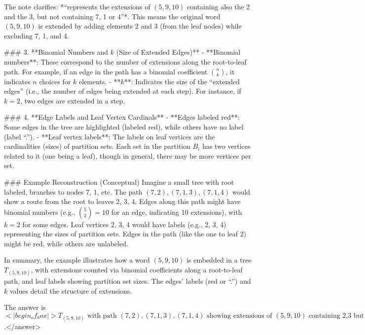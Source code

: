 The note clarifies: *“represents the extensions of \( (5,9,10) \) containing also the 2 and the 3, but not containing 7, 1 or 4”*. This means the original word \( (5,9,10) \) is extended by adding elements 2 and 3 (from the leaf nodes) while excluding 7, 1, and 4.  


### 3. **Binomial Numbers and \( k \) (Size of Extended Edges)**  
- **Binomial numbers**: These correspond to the number of extensions along the root-to-leaf path. For example, if an edge in the path has a binomial coefficient \( \binom{n}{k} \), it indicates \( n \) choices for \( k \) elements.  
- **\( k \)**: Indicates the size of the “extended edges” (i.e., the number of edges being extended at each step). For instance, if \( k = 2 \), two edges are extended in a step.  


### 4. **Edge Labels and Leaf Vertex Cardinals**  
- **Edges labeled red**: Some edges in the tree are highlighted (labeled red), while others have no label (label “.”).  
- **Leaf vertex labels**: The labels on leaf vertices are the cardinalities (sizes) of partition sets. Each set in the partition \( B_i \) has two vertices related to it (one being a leaf), though in general, there may be more vertices per set.  


### Example Reconstruction (Conceptual)  
Imagine a small tree with root labeled, branches to nodes 7, 1, etc. The path \( (7,2),(7,1,3),(7,1,4) \) would show a route from the root to leaves 2, 3, 4. Edges along this path might have binomial numbers (e.g., \( \binom{5}{2} = 10 \) for an edge, indicating 10 extensions), with \( k = 2 \) for some edges. Leaf vertices 2, 3, 4 would have labels (e.g., 2, 3, 4) representing the sizes of partition sets. Edges in the path (like the one to leaf 2) might be red, while others are unlabeled.  


In summary, the example illustrates how a word \( (5,9,10) \) is embedded in a tree \( T_{(5,9,10)} \), with extensions counted via binomial coefficients along a root-to-leaf path, and leaf labels showing partition set sizes. The edges’ labels (red or “.”) and \( k \) values detail the structure of extensions.  

The answer is \(<|begin_of_box|>T_{(5,9,10)} \text{ with path } (7,2),(7,1,3),(7,1,4) \text{ showing extensions of } (5,9,10) \text{ containing 2,3 but not 7,1,4}<|end_of_box|>\).</answer>